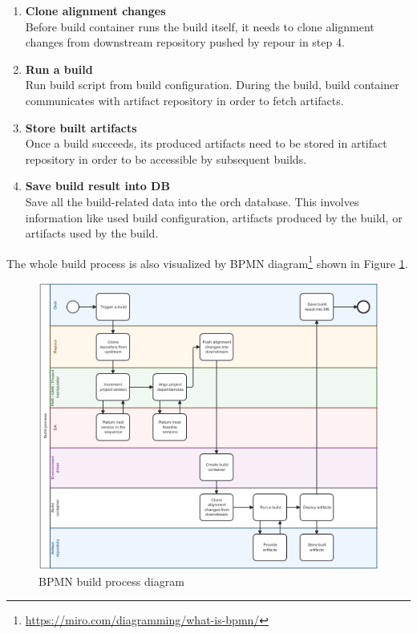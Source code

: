 \documentclass[../main.tex]{subfiles}
\begin{document}
\begin{enumerate}
    \item \textbf{Clone alignment changes}\\
    Before build container runs the build itself, it needs to clone alignment changes from downstream repository pushed by repour in step 4.

    \item \textbf{Run a build}\\
    Run build script from build configuration. During the build, build container communicates with artifact repository in order to fetch artifacts.

    \item \textbf{Store built artifacts}\\
    Once a build succeeds, its produced artifacts need to be stored in artifact repository in order to be accessible by subsequent builds.

    \item \textbf{Save build result into DB}\\
    Save all the build-related data into the orch database. This involves information like used build configuration, artifacts produced by the build, or artifacts used by the build.
    
\end{enumerate}

The whole build process is also visualized by BPMN diagram\footnote{\url{https://miro.com/diagramming/what-is-bpmn/}} shown in Figure \ref{fig:build-process-bpmn}.

\begin{figure}
  \begin{center}
    \includegraphics[width=\textwidth]{images/build-process-bpmn.png}
  \end{center}
  \caption{BPMN build process diagram}
  \label{fig:build-process-bpmn}
\end{figure}
\end{document}
